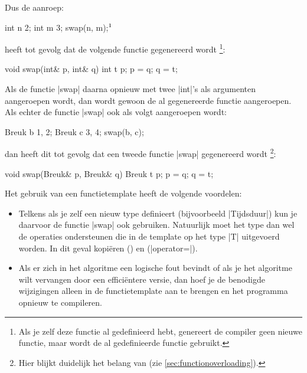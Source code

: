 \begin{cpplstShortInline}
Dus de aanroep:
\begin{cpplstfragment}[mathescape=true]
	int n {2};
	int m {3};
	swap(n, m);$\footnotemark$
\end{cpplstfragment}
heeft tot gevolg dat de volgende functie gegenereerd wordt%
\footnote{%
    Als je zelf deze functie al gedefinieerd hebt, genereert de compiler geen nieuwe functie, maar wordt de al gedefinieerde functie gebruikt.
}:
\begin{cpplstfragment}
void swap(int& p, int& q) {
    int t {p};
    p = q;
    q = t;
}
\end{cpplstfragment}

Als de functie |swap| daarna opnieuw met twee |int|'s als argumenten aangeroepen wordt, dan wordt gewoon de al gegenereerde functie aangeroepen.
Als echter de functie |swap| ook als volgt aangeroepen wordt:
\begin{cpplstfragment}
    Breuk b {1, 2};
    Breuk c {3, 4};
    swap(b, c);
\end{cpplstfragment}
dan heeft dit tot gevolg dat een tweede functie |swap| gegenereerd wordt%
\footnote{%
Hier blijkt duidelijk het belang van  (zie \cref{sec:functionoverloading}).
}:
\begin{cpplstfragment}
void swap(Breuk& p, Breuk& q) {
    Breuk t {p};
    p = q;
    q = t;
}
\end{cpplstfragment}

Het gebruik van een functietemplate heeft de volgende voordelen:
\begin{itemize}
    \item Telkens als je zelf een nieuw type definieert (bijvoorbeeld |Tijdsduur|) kun je daarvoor de functie |swap| ook gebruiken.
    Natuurlijk moet het type  dan wel de operaties ondersteunen die in de template op het type |T| uitgevoerd worden.
    In dit geval kopiëren () en  (|operator=|).
    \item Als er zich in het algoritme een logische fout bevindt of als je het algoritme wilt vervangen door een efficiëntere versie, dan hoef je de benodigde wijzigingen alleen in de functietemplate aan te brengen en het programma opnieuw te compileren.
\end{itemize}


\end{cpplstShortInline}
